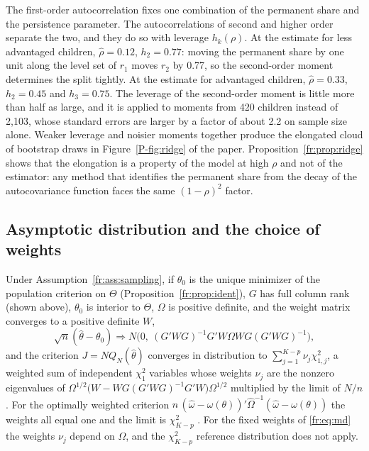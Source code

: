 The first-order autocorrelation fixes one combination of the permanent
share and the persistence parameter. The autocorrelations of second and
higher order separate the two, and they do so with leverage
$h_k(\rho)$. At the estimate for less advantaged children, $\hat\rho = 0.12$, $h_2 = 0.77$: moving the permanent share by one unit along the level set
of $r_1$ moves $r_2$ by 0.77, so the second-order moment determines the
split tightly. At the estimate for advantaged children,
$\hat\rho = 0.33$, $h_2 = 0.45$ and $h_3 = 0.75$. The leverage of the second-order moment is little more than half as large, and it is applied to moments from
420 children instead of 2,103, whose standard errors are larger by a
factor of about 2.2 on sample size alone. Weaker leverage and noisier
moments together produce the elongated cloud of bootstrap draws in
Figure~\ref{P-fig:ridge} of the paper. Proposition~\ref{fr:prop:ridge}
shows that the elongation is a property of the model at high $\rho$ and
not of the estimator: any method that identifies the permanent share
from the decay of the autocovariance function faces the same
$(1-\rho)^2$ factor.

\subsection{Asymptotic distribution and the choice of weights}

\begin{proposition}
\label{fr:prop:asy}
Under Assumption~\ref{fr:ass:sampling}, if $\theta_0$ is the unique minimizer of the population criterion on $\Theta$ (Proposition~\ref{fr:prop:ident}), $G$ has full column rank (shown above), $\theta_0$ is interior to $\Theta$, $\Omega$ is positive definite, and the weight matrix converges to a positive definite $W$,
\begin{equation}
\sqrt{n}(\hat\theta - \theta_0) \Rightarrow N\!\big(0,\ (G'WG)^{-1}G'W\Omega WG(G'WG)^{-1}\big),
\label{fr:eq:asy}
\end{equation}
and the criterion $J = N Q_N(\hat\theta)$ converges in distribution to
$\sum_{j=1}^{K-p}\nu_j\chi^2_{1,j}$, a weighted sum of independent
$\chi^2_1$ variables whose weights $\nu_j$ are the nonzero
eigenvalues of $\Omega^{1/2}\big(W - WG(G'WG)^{-1}G'W\big)\Omega^{1/2}$
multiplied by the limit of $N/n$. For the optimally weighted criterion
$n\,(\hat\omega - \omega(\theta))'\hat\Omega^{-1}(\hat\omega - \omega(\theta))$
the weights all equal one and the limit is $\chi^2_{K-p}$
\citep{Hansen1982}. For the fixed weights of \eqref{fr:eq:md} the weights
$\nu_j$ depend on $\Omega$, and the $\chi^2_{K-p}$ reference
distribution does not apply.
\end{proposition}

